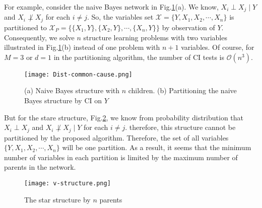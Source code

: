\documentclass{article}
\newcommand{\X}{\mathcal{X}}
\begin{document}
For example, consider the naive Bayes network in Fig.\ref{f-naive}(a). We know, $X_i\perp X_j \mid Y$ and $X_i\not\perp X_j$ for each $i\not = j$. So, the variables set $\X=\{Y,X_1,X_2,\cdots, X_n\}$ is partitioned to $\X_P = \{ \{X_1,Y\}, \{X_2,Y\}, \cdots, \{X_n,Y\} \}$ by observation of $Y$. Consequently, we solve $n$ structure learning problems with two variables illustrated in Fig.\ref{f-naive}(b) instead of one problem with $n+1$ variables. 
Of course, for $M=3$ or $d = 1$ in the partitioning algorithm, the number of CI tests is $\mathcal{O}(n^3)$. 

\begin{figure}[!ht]
    \centering
    \texttt{[image: Dist-common-cause.png]}
    \caption{(a) Naive Bayes structure with $n$ children. (b) Partitioning the naive Bayes structure by CI on $Y$  }
    \label{f-naive}
\end{figure}

But for the stare structure, Fig.\ref{f-vstare}, we know from probability distribution that $X_i\perp X_j$ and  $X_i\not\perp X_j\mid Y$ for each $i\not = j$. therefore, this structure cannot be partitioned by the proposed algorithm. Therefore, the set of all variables $\{Y,X_1,X_2,\cdots, X_n\}$ will be one partition. As a result, it seems that the minimum number of variables in each partition is limited by the maximum number of parents in the network.
\begin{figure}[!ht]
    \centering
    \texttt{[image: v-structure.png]}
    \caption{The star structure by $n$ parents}
    \label{f-vstare}
\end{figure}
\end{document}

